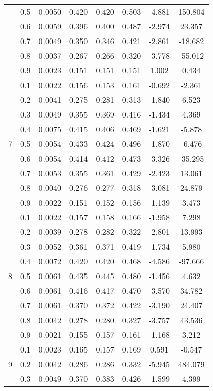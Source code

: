 \documentclass[11pt,a4paper]{report}
\begin{document}
\begin{longtable}{ | c | c || c | c | c | c | c | c | }
 & 0.5 & 0.0050 & 0.420 & 0.420 & 0.503 & -4.881 & 150.804 \\
 & 0.6 & 0.0059 & 0.396 & 0.400 & 0.487 & -2.974 & 23.357 \\
 & 0.7 & 0.0049 & 0.350 & 0.346 & 0.421 & -2.861 & -18.682 \\
 & 0.8 & 0.0037 & 0.267 & 0.266 & 0.320 & -3.778 & -55.012 \\
 & 0.9 & 0.0023 & 0.151 & 0.151 & 0.151 & 1.002 & 0.434 \\
 \hline
\multirow{9}{*}{7} & 0.1 & 0.0022 & 0.156 & 0.153 & 0.161 & -0.692 & -2.361 \\
 & 0.2 & 0.0041 & 0.275 & 0.281 & 0.313 & -1.840 & 6.523 \\
 & 0.3 & 0.0049 & 0.355 & 0.369 & 0.416 & -1.434 & 4.369 \\
 & 0.4 & 0.0075 & 0.415 & 0.406 & 0.469 & -1.621 & -5.878 \\
 & 0.5 & 0.0054 & 0.433 & 0.424 & 0.496 & -1.870 & -6.476 \\
 & 0.6 & 0.0054 & 0.414 & 0.412 & 0.473 & -3.326 & -35.295 \\
 & 0.7 & 0.0053 & 0.355 & 0.361 & 0.429 & -2.423 & 13.061 \\
 & 0.8 & 0.0040 & 0.276 & 0.277 & 0.318 & -3.081 & 24.879 \\
 & 0.9 & 0.0022 & 0.151 & 0.152 & 0.156 & -1.139 & 3.473 \\
 \hline
\multirow{9}{*}{8} & 0.1 & 0.0022 & 0.157 & 0.158 & 0.166 & -1.958 & 7.298 \\
 & 0.2 & 0.0039 & 0.278 & 0.282 & 0.322 & -2.801 & 13.993 \\
 & 0.3 & 0.0052 & 0.361 & 0.371 & 0.419 & -1.734 & 5.980 \\
 & 0.4 & 0.0072 & 0.420 & 0.420 & 0.468 & -4.586 & -97.666 \\
 & 0.5 & 0.0061 & 0.435 & 0.445 & 0.480 & -1.456 & 4.632 \\
 & 0.6 & 0.0061 & 0.416 & 0.417 & 0.470 & -3.570 & 34.782 \\
 & 0.7 & 0.0061 & 0.370 & 0.372 & 0.422 & -3.190 & 24.407 \\
 & 0.8 & 0.0042 & 0.278 & 0.280 & 0.327 & -3.757 & 43.536 \\
 & 0.9 & 0.0021 & 0.155 & 0.157 & 0.161 & -1.168 & 3.212 \\
 \hline
\multirow{9}{*}{9} & 0.1 & 0.0023 & 0.165 & 0.157 & 0.169 & 0.591 & -0.547 \\
 & 0.2 & 0.0042 & 0.286 & 0.286 & 0.332 & -5.945 & 484.079 \\
 & 0.3 & 0.0049 & 0.370 & 0.383 & 0.426 & -1.599 & 4.399 \\

\end{longtable}
\end{document}
